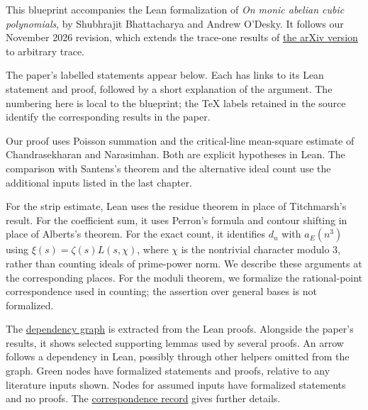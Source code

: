 This blueprint accompanies the Lean formalization of
\emph{On monic abelian cubic polynomials}, by Shubhrajit Bhattacharya and
Andrew O'Desky. It follows our November 2026 revision, which extends the
trace-one results of \href{https://arxiv.org/abs/2310.17831}{the arXiv version}
to arbitrary trace.

The paper's labelled statements appear below. Each has links to its
Lean statement and proof, followed by a short explanation of the argument.
The numbering here is local to the blueprint; the TeX labels retained in the
source identify the corresponding results in the paper.

Our proof uses Poisson summation and the critical-line
mean-square estimate of Chandrasekharan and Narasimhan. Both are explicit
hypotheses in Lean. The comparison with Santens's theorem and the alternative
ideal count use the additional inputs listed in the last chapter.

For the strip estimate, Lean uses the residue theorem in place of
Titchmarsh's result. For the coefficient sum, it uses Perron's formula and
contour shifting in place of Alberts's theorem. For the exact count, it
identifies $d_n$ with $a_E(n^3)$ using $\xi(s)=\zeta(s)L(s,\chi)$, where $\chi$
is the nontrivial character modulo $3$, rather than counting ideals of
prime-power norm. We describe these arguments
at the corresponding places. For the moduli theorem, we formalize the
rational-point correspondence used in counting; the assertion over general
bases is not formalized.

The \href{dep_graph_document.html}{dependency graph} is extracted from
the Lean proofs. Alongside the paper's results, it shows selected supporting
lemmas used by several proofs. An arrow follows a dependency in Lean, possibly
through other helpers omitted from the graph. Green nodes have formalized statements and proofs,
relative to any literature inputs shown. Nodes for assumed inputs have
formalized statements and no proofs. The
\href{https://github.com/aodesky/abelian-cubics/blob/main/CORRESPONDENCE.md}{correspondence record}
gives further details.
